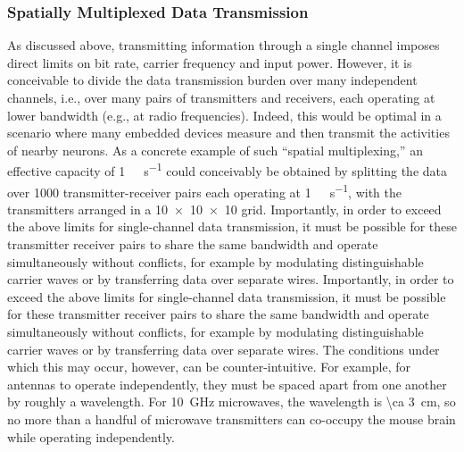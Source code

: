 \subsubsection{Spatially Multiplexed Data Transmission}

As discussed above, transmitting information through a single channel imposes direct limits on bit rate, carrier frequency and input power.
However, it is conceivable to divide the data transmission burden over many independent channels, i.e., over many pairs of transmitters and receivers, each operating at lower bandwidth (e.g., at radio frequencies).
Indeed, this would be optimal in a scenario where many embedded devices measure and then transmit the activities of nearby neurons.
As a concrete example of such ``spatial multiplexing,'' an effective capacity of \SI{1}{\tera\bit\per\second} could conceivably be obtained by splitting the data over \num{1000} transmitter-receiver pairs each operating at \SI{1}{\giga\bit\per\second}, with the transmitters arranged in a \num{10 x 10 x 10} grid.
Importantly, in order to exceed the above limits for single-channel data transmission, it must be possible for these transmitter receiver pairs to share the same bandwidth and operate simultaneously without conflicts, for example by modulating distinguishable carrier waves or by transferring data over separate wires.
Importantly, in order to exceed the above limits for single-channel data transmission, it must be possible for these transmitter receiver pairs to share the same bandwidth and operate simultaneously without conflicts, for example by modulating distinguishable carrier waves or by transferring data over separate wires.
The conditions under which this may occur, however, can be counter-intuitive.
For example, for antennas to operate independently, they must be spaced apart from one another by roughly a wavelength.
For \SI{10}{\giga\hertz} microwaves, the wavelength is \SI{\ca 3}{\centi\meter}, so no more than a handful of microwave transmitters can co-occupy the mouse brain while operating independently.

